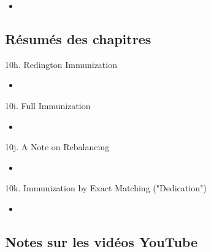 \begin{YTB_vids}
\begin{itemize}
	\item	
\end{itemize}
\end{YTB_vids}

\subsection{Résumés des chapitres}

\begin{CHPT_SUMM_AUTO}[label = {L.-10h}]{10h. Redington Immunization}
	\begin{itemize}
		\item	
	\end{itemize}
\end{CHPT_SUMM_AUTO}

\begin{CHPT_SUMM_AUTO}[label = {L.-10i}]{10i. Full Immunization}
	\begin{itemize}
		\item	
	\end{itemize}
\end{CHPT_SUMM_AUTO}

\begin{CHPT_SUMM_AUTO}[label = {L.-10j}]{10j. A Note on Rebalancing}
	\begin{itemize}
		\item	
	\end{itemize}
\end{CHPT_SUMM_AUTO}

\begin{CHPT_SUMM_AUTO}[label = {L.-10k}]{10k. Immunization by Exact Matching ("Dedication")}
	\begin{itemize}
		\item	
	\end{itemize}
\end{CHPT_SUMM_AUTO}

\subsection{Notes sur les vidéos YouTube}

